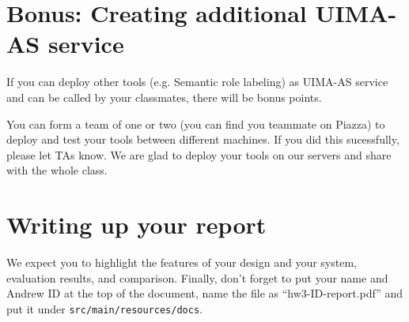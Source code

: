 \section{Bonus: Creating additional UIMA-AS service}
If you can deploy other tools (e.g. Semantic role labeling) as UIMA-AS service and 
can be called by your classmates, there will be bonus points.  

You can form a team of one or two (you can find you teammate on Piazza) to deploy and test your tools between different machines. 
If you did this sucessfully, please let TAs know. 
We are glad to deploy your tools on our servers and share with the whole class. 


\section{Writing up your report}

We expect you to highlight the features of your design and your system, evaluation results, and comparison.
Finally, don't forget to put your name and Andrew ID at the top of the document, name the
file as ``hw3-ID-report.pdf'' and put it under \texttt{src/main/resources/docs}.

